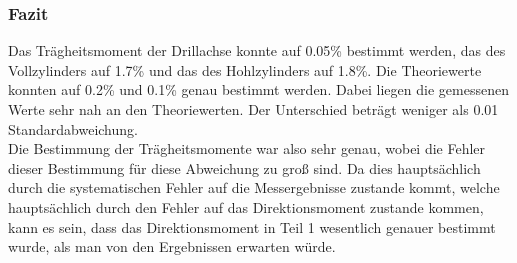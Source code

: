 \documentclass[12pt,a4paper]{article}
\begin{document}
\subsubsection{Fazit}
Das Trägheitsmoment der Drillachse konnte auf 0.05\% bestimmt werden, das des Vollzylinders auf 1.7\% und das des Hohlzylinders auf 1.8\%. Die Theoriewerte konnten auf 0.2\% und 0.1\% genau bestimmt werden. Dabei liegen die gemessenen Werte sehr nah an den Theoriewerten. Der Unterschied beträgt weniger als 0.01 Standardabweichung.\\
Die Bestimmung der Trägheitsmomente war also sehr genau, wobei die Fehler dieser Bestimmung für diese Abweichung zu groß sind. Da dies hauptsächlich durch die systematischen Fehler auf die Messergebnisse zustande kommt, welche hauptsächlich durch den Fehler auf das Direktionsmoment zustande kommen, kann es  sein, dass das Direktionsmoment in Teil 1 wesentlich genauer bestimmt wurde, als man von den Ergebnissen erwarten würde.
\end{document}

